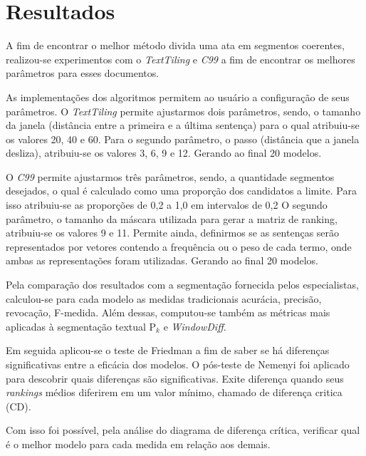 \section{Resultados}
	\label{sec:resultados}

A fim de encontrar o melhor método divida uma ata em segmentos coerentes, realizou-se experimentos com o \textit{TextTiling} e \textit{C99} a fim de encontrar os melhores parâmetros para esses documentos.


As implementações dos algoritmos permitem ao usuário a configuração de seus parâmetros. 
%
O \textit{TextTiling} permite ajustarmos dois parâmetros, sendo, o tamanho da janela (distância entre a primeira e a última sentença) para o qual atribuiu-se os valores 20, 40 e 60. Para o segundo parâmetro, o passo (distância que a janela desliza), atribuiu-se os valores 3, 6, 9 e 12. Gerando ao final 20 modelos.
%

O \textit{C99} permite ajustarmos três parâmetros, sendo, a quantidade segmentos desejados, o qual é calculado como uma proporção dos candidatos a limite. Para isso atribuiu-se as proporções de 0,2 a 1,0 em intervalos de 0,2 O segundo parâmetro, o tamanho da máscara utilizada para gerar a matriz de ranking, atribuiu-se os valores 9 e 11. Permite ainda, definirmos se as sentenças serão representados por vetores contendo a frequência ou o peso de cada termo, onde ambas as representações foram utilizadas. Gerando ao final 20 modelos.



Pela comparação dos resultados com a segmentação fornecida pelos especialistas, calculou-se para cada modelo as medidas tradicionais acurácia, precisão, revocação, F-medida. Além dessas, computou-se também as métricas mais aplicadas à segmentação textual P$_k$ e \textit{WindowDiff}.



Em seguida aplicou-se o teste de Friedman a fim de saber se há diferenças significativas entre a eficácia dos modelos. O pós-teste de Nemenyi foi aplicado para descobrir quais diferenças são significativas. 
%
Exite diferença quando seus \textit{rankings} médios diferirem em um valor mínimo, chamado de diferença critica (CD). 
%

Com isso foi possível, pela análise do diagrama de diferença crítica, verificar qual é o melhor modelo para cada medida
em relação aos demais. 


